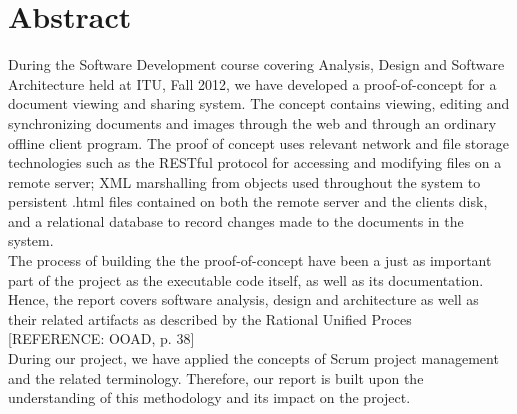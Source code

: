 \section{Abstract}
During the Software Development course covering Analysis, Design and Software Architecture held at ITU, Fall 2012, we have developed a proof-of-concept for a document viewing and sharing system. The concept contains viewing, editing and synchronizing documents and images through the web and through an ordinary offline client program. 
The proof of concept uses relevant network and file storage technologies such as the RESTful protocol for accessing and modifying files on a remote server; XML marshalling from objects used throughout the system to persistent .html files contained on both the remote server and the clients disk, and a relational database to record changes made to the documents in the system.\\
\newline
The process of building the the proof-of-concept have been a just as important part of the project as the executable code itself, as well as its documentation. Hence, the report covers software analysis, design and architecture as well as their related artifacts as described by the Rational Unified Proces [REFERENCE: OOAD, p. 38]\\
\newline
During our project, we have applied the concepts of Scrum project management and the related terminology. Therefore, our report is built upon the understanding of this methodology and its impact on the project.
\newpage